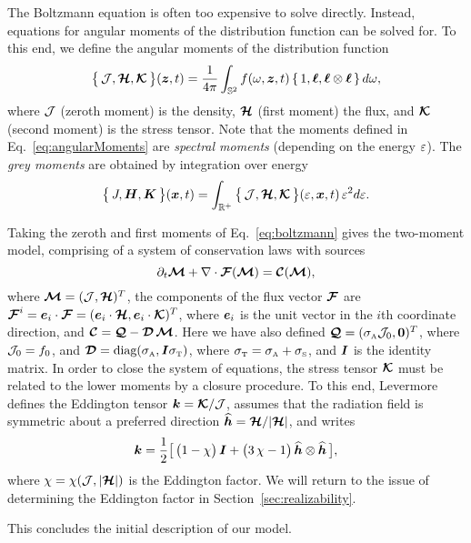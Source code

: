 The Boltzmann equation is often too expensive to solve directly.  
Instead, equations for angular moments of the distribution function can be solved for.  
To this end, we define the angular moments of the distribution function
\begin{equation}
  \big\{\,\mathcal{J},\boldsymbol{\mathcal{H}},\boldsymbol{\mathcal{K}}\,\big\}(\boldsymbol{z},t)
  =\frac{1}{4\pi}\int_{\mathbb{S}^{2}}f(\omega,\boldsymbol{z},t)\,\{\,1,\boldsymbol{\ell},\boldsymbol{\ell}\otimes\boldsymbol{\ell}\,\}\,d\omega,
  \label{eq:angularMoments}
\end{equation}
where $\mathcal{J}$ (zeroth moment) is the density, $\boldsymbol{\mathcal{H}}$ (first moment) the flux, and $\boldsymbol{\mathcal{K}}$ (second moment) is the stress tensor.  
Note that the moments defined in Eq.~\ref{eq:angularMoments} are \emph{spectral moments} (depending on the energy $\varepsilon$).  
The \emph{grey moments} are obtained by integration over energy
\begin{equation}
  \big\{\,J,\boldsymbol{H},\boldsymbol{K}\,\big\}(\boldsymbol{x},t)
  =\int_{\mathbb{R}^{+}}\big\{\,\mathcal{J},\boldsymbol{\mathcal{H}},\boldsymbol{\mathcal{K}}\,\big\}(\varepsilon,\boldsymbol{x},t)\,\varepsilon^{2}d\varepsilon.  
\end{equation}

Taking the zeroth and first moments of Eq.~\eqref{eq:boltzmann} gives the two-moment model, comprising of a system of conservation laws with sources
\begin{equation}
  \partial_{t}{\boldsymbol{\mathcal{M}}}+\nabla\cdot\boldsymbol{\mathcal{F}}(\boldsymbol{\mathcal{M}})=\boldsymbol{\mathcal{C}}(\boldsymbol{\mathcal{M}}),
  \label{eq:momentEquations}
\end{equation}
where $\boldsymbol{\mathcal{M}}=(\mathcal{J},\boldsymbol{\mathcal{H}})^{T}$, the components of the flux vector $\boldsymbol{\mathcal{F}}$ are $\boldsymbol{\mathcal{F}}^{i}=\boldsymbol{e}_{i}\cdot\boldsymbol{\mathcal{F}}=(\boldsymbol{e}_{i}\cdot\boldsymbol{\mathcal{H}},\boldsymbol{e}_{i}\cdot\boldsymbol{\mathcal{K}})^{T}$, where $\boldsymbol{e}_{i}$ is the unit vector in the $i$th coordinate direction, and $\boldsymbol{\mathcal{C}}=\boldsymbol{\mathcal{Q}}-\boldsymbol{\mathcal{D}}\,\boldsymbol{\mathcal{M}}$.  
Here we have also defined $\boldsymbol{\mathcal{Q}}=(\sigma_{\mbox{\tiny A}}\mathcal{J}_{0},\boldsymbol{0})^{T}$, where $\mathcal{J}_{0}=f_{0}$, and $\boldsymbol{\mathcal{D}}=\mbox{diag}(\sigma_{\mbox{\tiny A}},\boldsymbol{I}\sigma_{\mbox{\tiny T}})$, where $\sigma_{\mbox{\tiny T}}=\sigma_{\mbox{\tiny A}}+\sigma_{\mbox{\tiny S}}$, and $\boldsymbol{I}$ is the identity matrix.  
In order to close the system of equations, the stress tensor $\boldsymbol{\mathcal{K}}$ must be related to the lower moments by a closure procedure.  
To this end, Levermore \cite{levermore_1984} defines the Eddington tensor $\boldsymbol{k}=\boldsymbol{\mathcal{K}}/\mathcal{J}$, assumes that the radiation field is symmetric about a preferred direction $\widehat{\boldsymbol{h}}=\boldsymbol{\mathcal{H}}/|\boldsymbol{\mathcal{H}}|$, and writes
\begin{equation}
  \boldsymbol{k}=\frac{1}{2}\big[\,\big(1-\chi\big)\,\boldsymbol{I}+\big(3\,\chi-1\big)\,\widehat{\boldsymbol{h}}\otimes\widehat{\boldsymbol{h}}\,\big],
\end{equation}
where $\chi=\chi(\mathcal{J},|\boldsymbol{\mathcal{H}}|)$ is the Eddington factor.  
We will return to the issue of determining the Eddington factor in Section~\ref{sec:realizability}.  

This concludes the initial description of our model.  